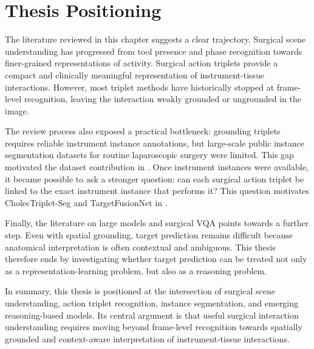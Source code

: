 \section{Thesis Positioning}
\label{sec:background-positioning}

The literature reviewed in this chapter suggests a clear trajectory. Surgical scene understanding has progressed from tool presence and phase recognition towards finer-grained representations of activity. Surgical action triplets provide a compact and clinically meaningful representation of instrument-tissue interactions. However, most triplet methods have historically stopped at frame-level recognition, leaving the interaction weakly grounded or ungrounded in the image.

The review process also exposed a practical bottleneck: grounding triplets requires reliable instrument instance annotations, but large-scale public instance segmentation datasets for routine laparoscopic surgery were limited. This gap motivated the dataset contribution in . Once instrument instances were available, it became possible to ask a stronger question: can each surgical action triplet be linked to the exact instrument instance that performs it? This question motivates CholecTriplet-Seg and TargetFusionNet in .

Finally, the literature on large models and surgical VQA points towards a further step. Even with spatial grounding, target prediction remains difficult because anatomical interpretation is often contextual and ambiguous. This thesis therefore ends by investigating whether target prediction can be treated not only as a representation-learning problem, but also as a reasoning problem.

In summary, this thesis is positioned at the intersection of surgical scene understanding, action triplet recognition, instance segmentation, and emerging reasoning-based models. Its central argument is that useful surgical interaction understanding requires moving beyond frame-level recognition towards spatially grounded and context-aware interpretation of instrument-tissue interactions.

